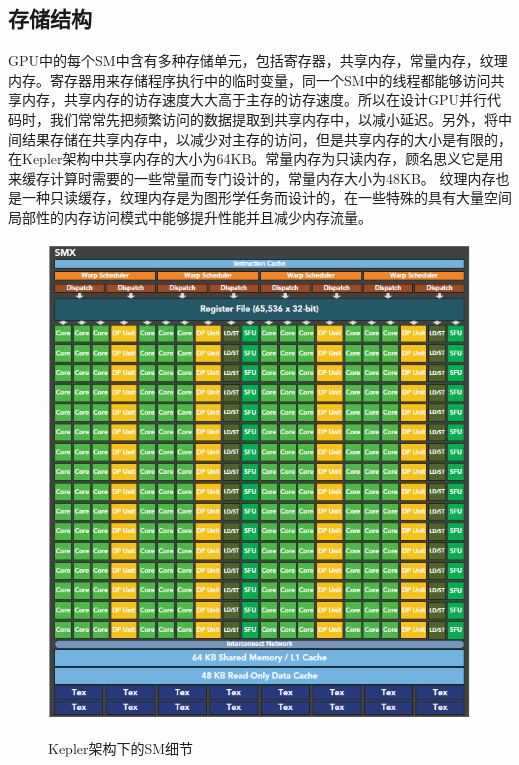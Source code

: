 \subsection{存储结构}
GPU中的每个SM中含有多种存储单元，包括寄存器，共享内存，常量内存，纹理内存。寄存器用来存储程序执行中的临时变量，同一个SM中的线程都能够访问共享内存，共享内存的访存速度大大高于主存的访存速度。所以在设计GPU并行代码时，我们常常先把频繁访问的数据提取到共享内存中，以减小延迟。另外，将中间结果存储在共享内存中，以减少对主存的访问，但是共享内存的大小是有限的，在Kepler架构中共享内存的大小为64KB。常量内存为只读内存，顾名思义它是用来缓存计算时需要的一些常量而专门设计的，常量内存大小为48KB。 纹理内存也是一种只读缓存，纹理内存是为图形学任务而设计的，在一些特殊的具有大量空间局部性的内存访问模式中能够提升性能并且减少内存流量。
\begin{figure}
\setlength{\abovecaptionskip}{-0.5cm}
\begin{center}
{\includegraphics[width=0.8 \textwidth]{figures/smx.png}}
\end{center}
\caption{{\footnotesize{Kepler架构下的SM细节}}}
\label{sm}
\end{figure}

